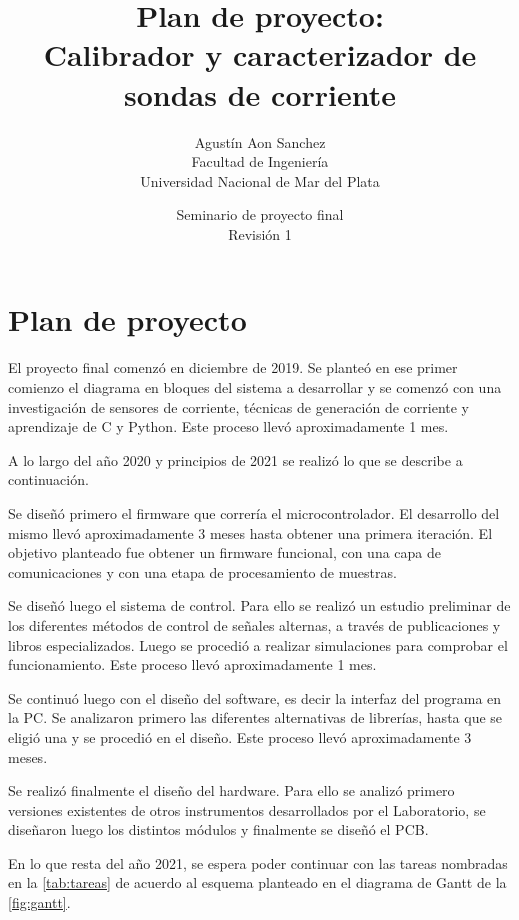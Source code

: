 \documentclass[titlepage, 12pt]{article}
\title{Plan de proyecto:\\Calibrador y caracterizador de sondas de corriente}
\author{Agustín Aon Sanchez\\ 
Facultad de Ingeniería\\
Universidad Nacional de Mar del Plata}
\date{Seminario de proyecto final\\Revisión 1}
\begin{document}
\maketitle

\renewcommand{\tablename}{Tabla}

\section*{Plan de proyecto}
El proyecto final comenzó en diciembre de 2019. Se planteó en ese primer comienzo el diagrama en bloques del sistema a desarrollar y se comenzó con una investigación de sensores de corriente, técnicas de generación de corriente y aprendizaje de C y Python. Este proceso llevó aproximadamente 1 mes.

A lo largo del año 2020 y principios de 2021 se realizó lo que se describe a continuación.

Se diseñó primero el firmware que correría el microcontrolador. El desarrollo del mismo llevó aproximadamente 3 meses hasta obtener una primera iteración. El objetivo planteado fue obtener un firmware funcional, con una capa de comunicaciones y con una etapa de procesamiento de muestras.

Se diseñó luego el sistema de control. Para ello se realizó un estudio preliminar de los diferentes métodos de control de señales alternas, a través de publicaciones y libros especializados. Luego se procedió a realizar simulaciones para comprobar el funcionamiento. Este proceso llevó aproximadamente 1 mes.

Se continuó luego con el diseño del software, es decir la interfaz del programa en la PC. Se analizaron primero las diferentes alternativas de librerías, hasta que se eligió una y se procedió en el diseño. Este proceso llevó aproximadamente 3 meses.

Se realizó finalmente el diseño del hardware. Para ello se analizó primero versiones existentes de otros instrumentos desarrollados por el Laboratorio, se diseñaron luego los distintos módulos y finalmente se diseñó el PCB. 

En lo que resta del año 2021, se espera poder continuar con las tareas nombradas en la \autoref{tab:tareas} de acuerdo al esquema planteado en el diagrama de Gantt de la \autoref{fig:gantt}.
 
\end{document}
